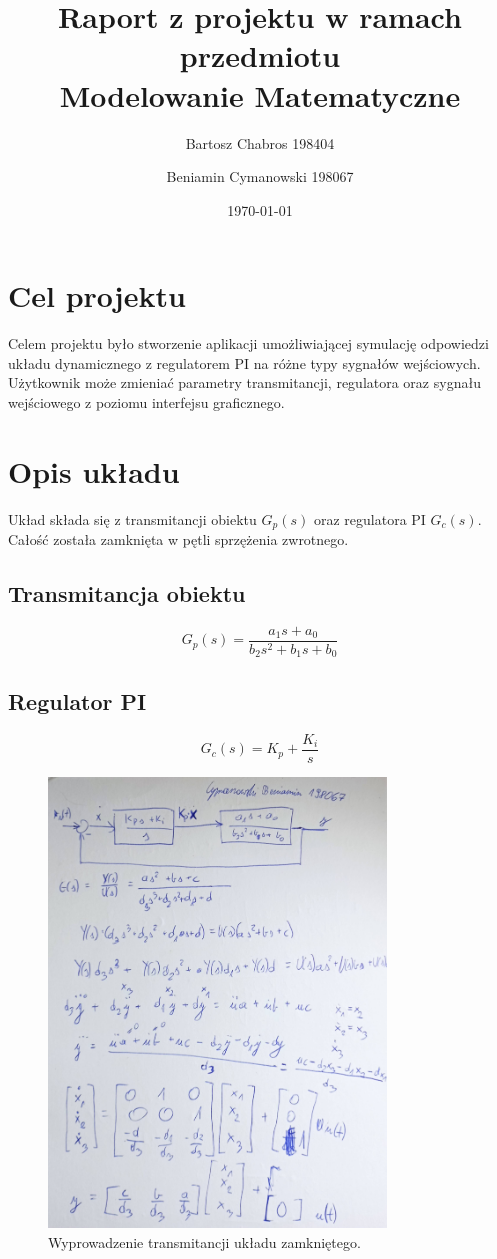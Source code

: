\documentclass[12pt,a4paper]{article}
\title{Raport z projektu w ramach przedmiotu \\ Modelowanie Matematyczne}
\author{Bartosz Chabros 198404 \and Beniamin Cymanowski 198067}
\date{\today}
\begin{document}
\maketitle

\section{Cel projektu}
Celem projektu było stworzenie aplikacji umożliwiającej symulację odpowiedzi układu dynamicznego z regulatorem PI na różne typy sygnałów wejściowych. Użytkownik może zmieniać parametry transmitancji, regulatora oraz sygnału wejściowego z poziomu interfejsu graficznego.

\section{Opis układu}
Układ składa się z transmitancji obiektu $G_p(s)$ oraz regulatora PI $G_c(s)$. Całość została zamknięta w pętli sprzężenia zwrotnego.

\subsection{Transmitancja obiektu}
\[
G_p(s) = \frac{a_1 s + a_0}{b_2 s^2 + b_1 s + b_0}
\]

\subsection{Regulator PI}
\[
G_c(s) = K_p + \frac{K_i}{s}
\]

\begin{figure}[h!]
    \centering
    \includegraphics[width=0.8\textwidth]{wyp.jpg}
    \caption{Wyprowadzenie transmitancji układu zamkniętego.}
\end{figure}
\end{document}
